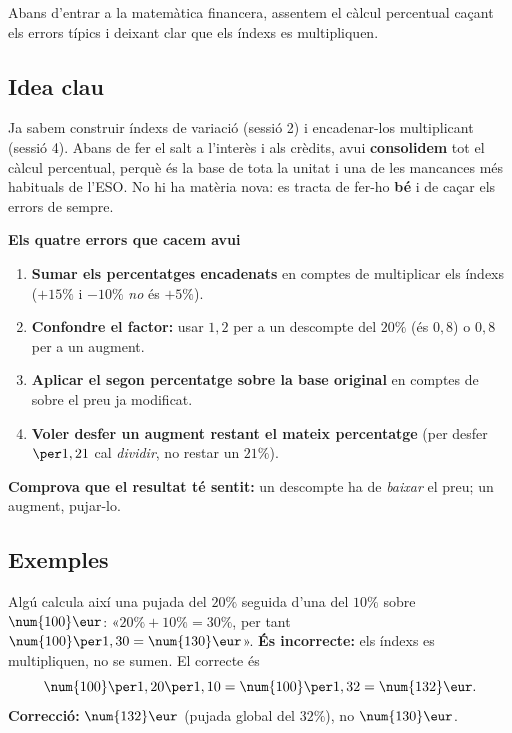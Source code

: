 %
{Abans d'entrar a la matemàtica financera, assentem el càlcul percentual caçant els errors típics i deixant clar que els índexs es multipliquen.}

\subsection{Idea clau}

Ja sabem construir índexs de variació (sessió 2) i encadenar-los multiplicant
(sessió 4). Abans de fer el salt a l'interès i als crèdits, avui \textbf{consolidem}
tot el càlcul percentual, perquè és la base de tota la unitat i una de les mancances
més habituals de l'ESO. No hi ha matèria nova: es tracta de fer-ho \textbf{bé} i de
caçar els errors de sempre.

\begin{idea}
\textbf{Els quatre errors que cacem avui}
\begin{enumerate}[leftmargin=1.6em, itemsep=2pt]
  \item \textbf{Sumar els percentatges encadenats} en comptes de multiplicar els
        índexs ($+15\%$ i $-10\%$ \emph{no} és $+5\%$).
  \item \textbf{Confondre el factor:} usar $1,2$ per a un descompte del $20\%$ (és
        $0,8$) o $0,8$ per a un augment.
  \item \textbf{Aplicar el segon percentatge sobre la base original} en comptes de
        sobre el preu ja modificat.
  \item \textbf{Voler desfer un augment restant el mateix percentatge} (per desfer
        $\per 1,21$ cal \emph{dividir}, no restar un $21\%$).
\end{enumerate}
\textbf{Comprova que el resultat té sentit:} un descompte ha de \emph{baixar} el preu;
un augment, pujar-lo.
\end{idea}

\subsection{Exemples}

\begin{exemple}
Algú calcula així una pujada del $20\%$ seguida d'una del $10\%$ sobre $\num{100}\eur$:
«$20\%+10\%=30\%$, per tant $\num{100}\per 1,30=\num{130}\eur$». \textbf{És
incorrecte:} els índexs es multipliquen, no se sumen. El correcte és
\[
\num{100}\per 1,20\per 1,10=\num{100}\per 1,32=\num{132}\eur.
\]
\textbf{Correcció:} $\num{132}\eur$ (pujada global del $32\%$), no $\num{130}\eur$.
\end{exemple}


